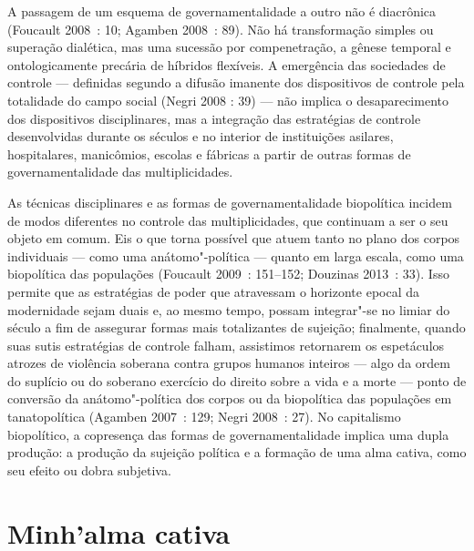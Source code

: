A passagem de um esquema de governamentalidade a outro não é diacrônica
(Foucault 2008~: 10; Agamben 2008~: 89). Não há transformação simples ou
superação dialética, mas uma sucessão por compenetração, a gênese
temporal e ontologicamente precária de híbridos flexíveis. A emergência
das sociedades de controle --- definidas segundo a difusão imanente dos
dispositivos de controle pela totalidade do campo social (Negri 2008 :
39) --- não implica o desaparecimento dos dispositivos disciplinares, mas
a integração das estratégias de controle desenvolvidas durante os
séculos  e  no interior de instituições asilares, hospitalares,
manicômios, escolas e fábricas a partir de outras formas de
governamentalidade das multiplicidades.

As técnicas disciplinares e as formas de governamentalidade biopolítica
incidem de modos diferentes no controle das multiplicidades, que
continuam a ser o seu objeto em comum. Eis o que torna possível que
atuem tanto no plano dos corpos individuais --- como uma anátomo"-política
--- quanto em larga escala, como uma biopolítica das populações (Foucault
2009~: 151--152; Douzinas 2013~: 33). Isso permite que as estratégias de
poder que atravessam o horizonte epocal da modernidade sejam duais e, ao
mesmo tempo, possam integrar"-se no limiar do século  a fim de
assegurar formas mais totalizantes de sujeição; finalmente, quando suas
sutis estratégias de controle falham, assistimos retornarem os
espetáculos atrozes de violência soberana contra grupos humanos inteiros
--- algo da ordem do suplício ou do soberano exercício do direito sobre a
vida e a morte --- ponto de conversão da anátomo"-política dos corpos ou
da biopolítica das populações em tanatopolítica (Agamben 2007~: 129;
Negri 2008~: 27). No capitalismo biopolítico, a copresença das formas
de governamentalidade implica uma dupla produção: a produção da sujeição
política e a formação de uma alma cativa, como seu efeito ou dobra
subjetiva.

\section{Minh'alma cativa}


